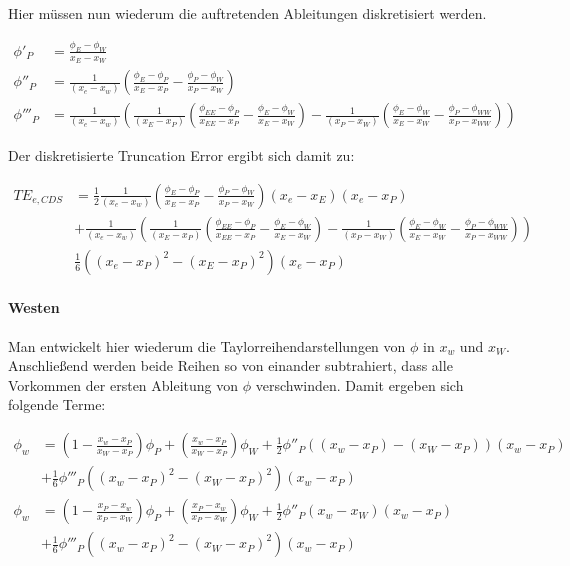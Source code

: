 Hier müssen nun wiederum die auftretenden Ableitungen diskretisiert werden.

\begin{align}
  \phi'_P &= \frac{\phi_E-\phi_W}{x_E-x_W}\\
  \phi''_P &= \frac{1}{(x_e-x_w)} \left({\frac{\phi_E-\phi_P}{x_E-x_P}
  - \frac{\phi_P-\phi_W}{x_P-x_W} }\right) \label{eq:ddphip}\\
  \phi'''_P &= \frac{1}{(x_e-x_w)} \left({
  \frac{1}{(x_E-x_P)} \left({\frac{\phi_{EE}-\phi_P}{x_{EE}-x_P}- \frac{\phi_E-\phi_W}{x_E-x_W} }\right)-
  \frac{1}{(x_P-x_W)} \left({\frac{\phi_E-\phi_W}{x_E-x_W} - \frac{\phi_P-\phi_{WW}}{x_P-x_{WW}} }\right)
  }\right) \label{eq:dddphip}
\end{align}

Der diskretisierte Truncation Error ergibt sich damit zu:

\begin{align}
  TE_{e, CDS} &=  \frac{1}{2} \frac{1}{(x_e-x_w)} \left({\frac{\phi_E-\phi_P}{x_E-x_P}
  - \frac{\phi_P-\phi_W}{x_P-x_W} }\right) (x_e-x_E) (x_e-x_P) \nonumber \\
  &+
 \frac{1}{(x_e-x_w)} \left({
  \frac{1}{(x_E-x_P)} \left({\frac{\phi_{EE}-\phi_P}{x_{EE}-x_P}- \frac{\phi_E-\phi_W}{x_E-x_W} }\right)-
  \frac{1}{(x_P-x_W)} \left({\frac{\phi_E-\phi_W}{x_E-x_W} - \frac{\phi_P-\phi_{WW}}{x_P-x_{WW}} }\right)
  }\right) \nonumber \\
  &\frac{1}{6} \left({(x_e-x_P)^2-(x_E-x_P)^2}\right)(x_e-x_P)
\end{align}

\paragraph{Westen}

Man entwickelt hier wiederum die Taylorreihendarstellungen von $\phi$ in $x_w$ und $x_W$.
Anschließend werden beide Reihen so von einander subtrahiert, dass alle Vorkommen
der ersten Ableitung von $\phi$ verschwinden. Damit ergeben sich folgende Terme:

\begin{align*}
  \phi_w &= \left({1-\frac{x_w-x_P}{x_W-x_P}}\right)\phi_P + \left({\frac{x_w-x_P}{x_W-x_P} }\right) \phi_W
  + \frac{1}{2} \phi''_P \left({(x_w-x_P)-(x_W-x_P)}\right)(x_w-x_P)\\
  &+ \frac{1}{6} \phi'''_P \left({(x_w-x_P)^2-(x_W-x_P)^2}\right)(x_w-x_P)\\
  \phi_w &= \left({1-\frac{x_P-x_w}{x_P-x_W}}\right)\phi_P + \left({\frac{x_P-x_w}{x_P-x_W} }\right) \phi_W
  + \frac{1}{2} \phi''_P \left({x_w-x_W}\right)(x_w-x_P)\\
  &+ \frac{1}{6} \phi'''_P \left({(x_w-x_P)^2-(x_W-x_P)^2}\right)(x_w-x_P)
\end{align*}

